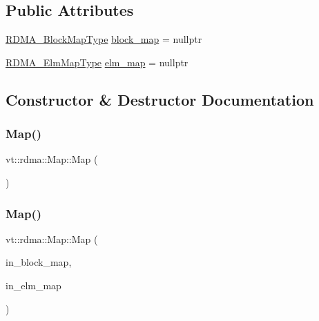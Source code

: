 \subsection*{Public Attributes}
\begin{DoxyCompactItemize}
\item 
\hyperlink{namespacevt_1_1rdma_a049e294a5236ad30692253d5f82886c9}{R\+D\+M\+A\+\_\+\+Block\+Map\+Type} \hyperlink{structvt_1_1rdma_1_1_map_a4c23ea8b0775c9598d818348e66b4976}{block\+\_\+map} = nullptr
\item 
\hyperlink{namespacevt_1_1rdma_a6798ab36a5dcb8749c25dff719f9ce07}{R\+D\+M\+A\+\_\+\+Elm\+Map\+Type} \hyperlink{structvt_1_1rdma_1_1_map_ab333842b2ae2f3efe15f1190bac32df2}{elm\+\_\+map} = nullptr
\end{DoxyCompactItemize}


\subsection{Constructor \& Destructor Documentation}
\mbox{\label{structvt_1_1rdma_1_1_map_a20781151e2a256532d75bda5d42f4685}} 
\subsubsection{\texorpdfstring{Map()}{Map()}\hspace{0.1cm}{\footnotesize\ttfamily [1/2]}}
{\footnotesize\ttfamily vt\+::rdma\+::\+Map\+::\+Map (\begin{DoxyParamCaption}{ }\end{DoxyParamCaption})\hspace{0.3cm}{\ttfamily [default]}}

\mbox{\label{structvt_1_1rdma_1_1_map_aa87802218cedbb5485a286199eed3489}} 
\subsubsection{\texorpdfstring{Map()}{Map()}\hspace{0.1cm}{\footnotesize\ttfamily [2/2]}}
{\footnotesize\ttfamily vt\+::rdma\+::\+Map\+::\+Map (\begin{DoxyParamCaption}\item[{\hyperlink{namespacevt_1_1rdma_a049e294a5236ad30692253d5f82886c9}{R\+D\+M\+A\+\_\+\+Block\+Map\+Type}}]{in\+\_\+block\+\_\+map,  }\item[{\hyperlink{namespacevt_1_1rdma_a6798ab36a5dcb8749c25dff719f9ce07}{R\+D\+M\+A\+\_\+\+Elm\+Map\+Type}}]{in\+\_\+elm\+\_\+map }\end{DoxyParamCaption})\hspace{0.3cm}{\ttfamily [inline]}}




